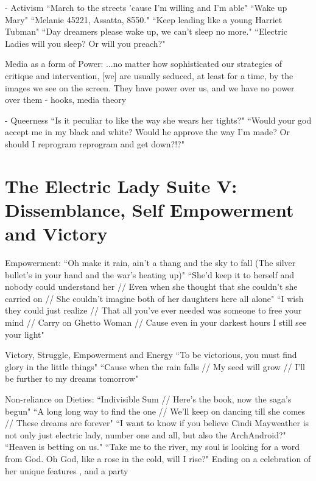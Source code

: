 \documentclass[a4paper, 11pt]{article} %
\begin{document}
- Activism
``March to the streets 'cause I'm willing and I'm able"\cite{queen}
``Wake up Mary"\cite{sallyride}
``Melanie 45221, Assatta, 8550."\cite{chromeshoppe}
``Keep leading like a young Harriet Tubman"\cite{queen}
``Day dreamers please wake up, we can't sleep no more."\cite{sincerelyjane}
``Electric Ladies will you sleep? Or will you preach?"\cite{queen}

Media as a form of Power:
...no matter how sophisticated our strategies of critique and intervention, [we] are usually seduced, at least for a time, by the images we see on the screen. They have power over us, and we have no power over them - hooks, media theory

- Queerness
``Is it peculiar to like the way she wears her tights?"\cite{queen}
``Would your god accept me in my black and white? Would he approve the way I'm made? Or should I reprogram reprogram and get down?!?"\cite{queen}


\section*{The Electric Lady Suite V: Dissemblance, Self Empowerment and Victory}

Empowerment: 
``Oh make it rain, ain't a thang and the sky to fall (The silver bullet's in your hand and the war's heating up)" \cite{manymoons}
``She'd keep it to herself and nobody could understand her // Even when she thought that she couldn't she carried on // She couldn't imagine both of her daughters here all alone"\cite{ghettowoman}
``I wish they could just realize // That all you've ever needed was someone to free your mind // Carry on Ghetto Woman // Cause even in your darkest hours I still see your light" \cite{ghettowoman}

Victory, Struggle, Empowerment and Energy
``To be victorious, you must find glory in the little things"\cite{victory}
``Cause when the rain falls // My seed will grow // I'll be further to my dreams tomorrow"\cite{victory}


Non-reliance on Dieties:
``Indivisible Sum // Here's the book, now the saga's begun"\cite{fiveseveneighttwoone}
``A long long way to find the one // We'll keep on dancing till she comes // These dreams are forever"\cite{danceordie}
``I want to know if you believe Cindi Mayweather is not only just electric lady, number one and all, but also the ArchAndroid?"\cite{favoritefugitive}
``Heaven is betting on us."\cite{primetime}
``Take me to the river, my soul is looking for a word from God. Oh God, like a rose in the cold, will I rise?"\cite{sallyride}
Ending on a celebration of her unique features \cite{dandridgeeyes}, and a party\cite{whatanexperience}
\end{document}
